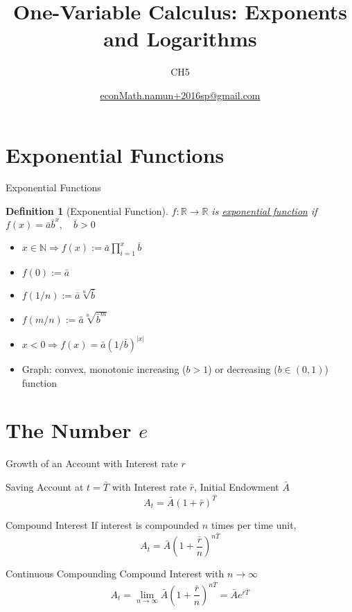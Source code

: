 \documentclass[final]{beamer}
\author[조남운]{\url{econMath.namun+2016sp@gmail.com}}
\title{One-Variable Calculus: Exponents and Logarithms}
\subtitle{CH5}
\newtheorem{defn}{Definition}
\begin{document}
	
\maketitle


\section{Exponential Functions} %
\label{sec:exponential_functions}
\begin{frame}[t]{Exponential Functions}
	\begin{defn}
		[Exponential Function]
		$f:\mathbb{R}\rightarrow\mathbb{R}$ is \uline{exponential function} if $f(x)=\bar a \bar b^x,\quad \bar b>0$
	\end{defn}
	\begin{itemize}
		\item $x\in\mathbb{N}\Rightarrow f(x):=\bar a \prod_{i=1}^x \bar b$
		\item $f(0) := \bar a$
		\item $f(1/n):= \bar a \sqrt[n]{\bar b}$
		\item $f(m/n):= \bar a \sqrt[n]{\bar b^m}$
		\item $x<0 \Rightarrow f(x)=\bar a (1/\bar b)^{|x|}$
		\item Graph: convex, monotonic increasing ($b>1$) or decreasing ($b\in(0,1)$) function
	\end{itemize}
\end{frame}

\section{The Number $e$} %
\label{sec:the_number_e}
\begin{frame}[t]{Growth of an Account with Interest rate $r$}
	\begin{block}
		{Saving Account at $t=\bar T$ with Interest rate $\bar r$, Initial Endowment $\bar A$}
		\[
			A_t = \bar A \left(1+\bar r\right)^{\bar T}
		\]
	\end{block}
	\begin{block}
		{Compound Interest} If interest is compounded $n$ times per time unit, 
		\[
			A_t = \bar A \left(1+\frac{\bar r}{n}\right)^{n\bar T}
		\]
	\end{block}
	\begin{block}
		{Continuous Compounding} Compound Interest with $n\rightarrow \infty$
		\[
			A_t = \lim_{n\rightarrow \infty}\bar A \left(1+\frac{\bar r}{n}\right)^{n\bar T} = \bar A e^{\bar r\bar T}
		\]
	\end{block}
\end{frame}
\end{document}

